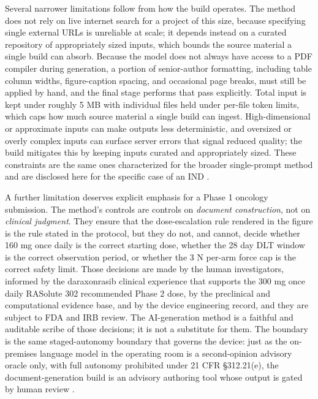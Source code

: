 Several narrower limitations follow from how the build operates. The method does not
rely on live internet search for a project of this size, because specifying single
external URLs is unreliable at scale; it depends instead on a curated repository of
appropriately sized inputs, which bounds the source material a single build can
absorb. Because the model does not always have access to a PDF compiler during
generation, a portion of senior-author formatting, including table column widths,
figure-caption spacing, and occasional page breaks, must still be applied by hand,
and the final stage performs that pass explicitly. Total input is kept under roughly
5 MB with individual files held under per-file token limits, which caps how much
source material a single build can ingest. High-dimensional or approximate inputs
can make outputs less deterministic, and oversized or overly complex inputs can
surface server errors that signal reduced quality; the build mitigates this by
keeping inputs curated and appropriately sized. These constraints are the same ones
characterized for the broader single-prompt method and are disclosed here for the
specific case of an IND \cite{ichpaistduni, chatgpt100kp, llmcomp16fda}.

A further limitation deserves explicit emphasis for a Phase 1 oncology submission.
The method's controls are controls on \textit{document construction}, not on
\textit{clinical judgment}. They ensure that the dose-escalation rule rendered in
the figure is the rule stated in the protocol, but they do not, and cannot, decide
whether 160 mg once daily is the correct starting dose, whether the 28 day DLT
window is the correct observation period, or whether the 3 N per-arm force cap is
the correct safety limit. Those decisions are made by the human investigators,
informed by the daraxonrasib clinical experience that supports the 300 mg once daily
RASolute 302 recommended Phase 2 dose, by the preclinical and computational evidence
base, and by the device engineering record, and they are subject to FDA and IRB
review. The AI-generation method is a faithful and auditable scribe of those
decisions; it is not a substitute for them. The boundary is the same staged-autonomy
boundary that governs the device: just as the on-premises language model in the
operating room is a second-opinion advisory oracle only, with full autonomy
prohibited under 21 CFR \S 312.21(e), the document-generation build is an advisory
authoring tool whose output is gated by human review \cite{congress9510,
clintrustpai}.

